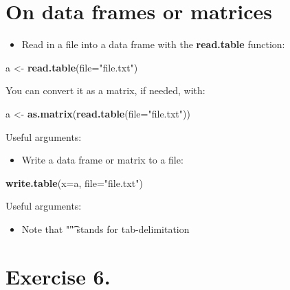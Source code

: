 \documentclass[]{book}
\newenvironment{Shaded}{\begin{snugshade}}{\end{snugshade}}
\newcommand{\DataTypeTok}[1]{\textcolor[rgb]{0.13,0.29,0.53}{#1}}
\newcommand{\KeywordTok}[1]{\textcolor[rgb]{0.13,0.29,0.53}{\textbf{#1}}}
\newcommand{\NormalTok}[1]{#1}
\newcommand{\StringTok}[1]{\textcolor[rgb]{0.31,0.60,0.02}{#1}}
\providecommand{\tightlist}{%
  \setlength{\itemsep}{0pt}\setlength{\parskip}{0pt}}
\begin{document}
\hypertarget{on-data-frames-or-matrices}{%
\section{On data frames or matrices}\label{on-data-frames-or-matrices}}

\begin{itemize}
\tightlist
\item
  Read in a file into a data frame with the \textbf{read.table} function:
\end{itemize}

\begin{Shaded}
\begin{Highlighting}[]
\NormalTok{a <-}\StringTok{ }\KeywordTok{read.table}\NormalTok{(}\DataTypeTok{file=}\StringTok{"file.txt"}\NormalTok{)}
\end{Highlighting}
\end{Shaded}

You can convert it as a matrix, if needed, with:

\begin{Shaded}
\begin{Highlighting}[]
\NormalTok{a <-}\StringTok{ }\KeywordTok{as.matrix}\NormalTok{(}\KeywordTok{read.table}\NormalTok{(}\DataTypeTok{file=}\StringTok{"file.txt"}\NormalTok{))}
\end{Highlighting}
\end{Shaded}

Useful arguments:

\begin{itemize}
\tightlist
\item
  Write a data frame or matrix to a file:
\end{itemize}

\begin{Shaded}
\begin{Highlighting}[]
\KeywordTok{write.table}\NormalTok{(}\DataTypeTok{x=}\NormalTok{a,}
    \DataTypeTok{file=}\StringTok{"file.txt"}\NormalTok{)}
\end{Highlighting}
\end{Shaded}

Useful arguments:

\begin{itemize}
\tightlist
\item
  Note that "\t" stands for tab-delimitation
\end{itemize}

\hypertarget{exercise-6.}{%
\section{Exercise 6.}\label{exercise-6.}}
\end{document}
